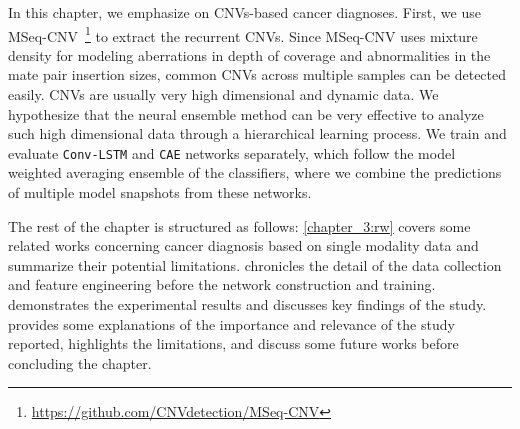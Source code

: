 \hspace*{3.5mm} In this chapter, we emphasize on CNVs-based cancer diagnoses. First, we use MSeq-CNV~\cite{malekpour2018mseq}\footnote{\url{https://github.com/CNVdetection/MSeq-CNV}} to extract the recurrent CNVs. Since MSeq-CNV uses mixture density for modeling aberrations in depth of coverage and abnormalities in the mate pair insertion sizes, common CNVs across multiple samples can be detected easily. CNVs are usually very high dimensional and dynamic data. We hypothesize that the neural ensemble method can be very effective to analyze such high dimensional data through a hierarchical learning process. We train and evaluate \texttt{Conv-LSTM} and \texttt{CAE} networks separately, which follow the model weighted averaging ensemble of the classifiers, where we combine the predictions of multiple model snapshots from these networks.  %

\hspace*{3.5mm} The rest of the chapter is structured as follows:
\cref{chapter_3:rw} covers some related works concerning cancer diagnosis based on single modality data and summarize their potential limitations.  chronicles the detail of the data collection and feature engineering before the network construction and training.  demonstrates the experimental results and discusses key findings of the study.  provides some explanations of the importance and relevance of the study reported, highlights the limitations, and discuss some future works before concluding the chapter. 

